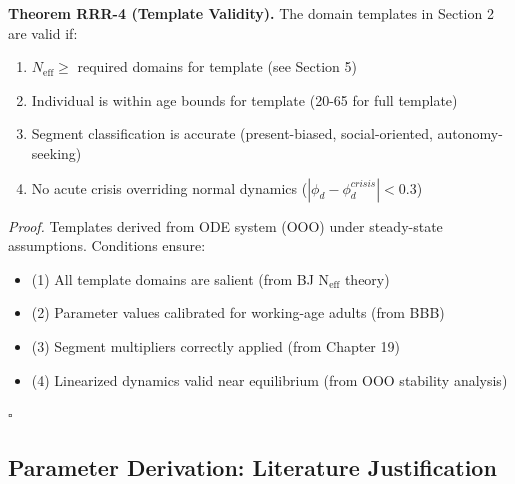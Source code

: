 \begin{tcolorbox}[colback=green!5!white, colframe=green!75!black, title=Theorem RRR-4: Template Validity Conditions]
\textbf{Theorem RRR-4 (Template Validity).}
The domain templates in Section 2 are valid if:
\begin{enumerate}[nosep]
\item $N_{\text{eff}} \geq$ required domains for template (see Section 5)
\item Individual is within age bounds for template (20-65 for full template)
\item Segment classification is accurate (present-biased, social-oriented, autonomy-seeking)
\item No acute crisis overriding normal dynamics ($|\phi_d - \phi_d^{crisis}| < 0.3$)
\end{enumerate}

\textit{Proof.}
Templates derived from ODE system (OOO) under steady-state assumptions. Conditions ensure:
\begin{itemize}[nosep]
\item (1) All template domains are salient (from BJ N$_{\text{eff}}$ theory)
\item (2) Parameter values calibrated for working-age adults (from BBB)
\item (3) Segment multipliers correctly applied (from Chapter 19)
\item (4) Linearized dynamics valid near equilibrium (from OOO stability analysis)
\end{itemize}
\hfill $\square$
\end{tcolorbox}

\subsection{Parameter Derivation: Literature Justification}

